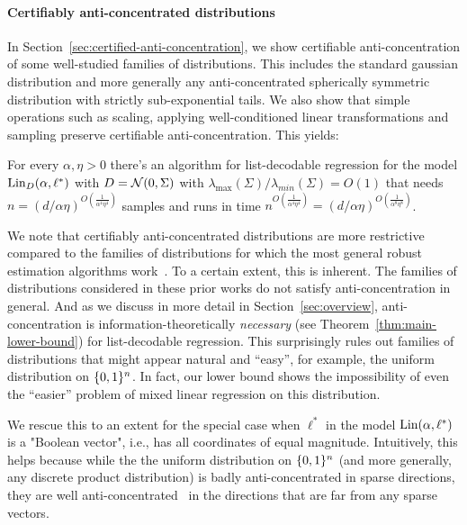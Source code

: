 \paragraph{Certifiably anti-concentrated distributions} In Section~\ref{sec:certified-anti-concentration}, we show certifiable anti-concentration of some well-studied families of distributions. This includes the standard gaussian distribution and more generally any anti-concentrated spherically symmetric distribution with strictly sub-exponential tails. We also show that simple operations such as scaling, applying well-conditioned linear transformations and sampling preserve certifiable anti-concentration. This yields:
\begin{corollary}
For every $\alpha, \eta > 0$ there's an algorithm for list-decodable regression for the model $\mathrm{Lin}_D(\alpha,\ell^*)$ with $D = \mathcal N(0,\Sigma)$ with $\lambda_{\max}(\Sigma)/\lambda_{min}(\Sigma) = O(1)$ that needs $n = (d/\alpha \eta)^{O\left(\frac{1}{\alpha^4 \eta^4}\right)}$  samples and runs in time $n^{O\left(\frac{1}{\alpha^4 \eta^4}\right)} = (d/\alpha \eta)^{O\left(\frac{1}{\alpha^8 \eta^8}\right)}$.
\end{corollary} 

We note that certifiably anti-concentrated distributions are more restrictive compared to the families of distributions for which the most general robust estimation algorithms work~\cite{2017KS,KothariSteinhardt17,DBLP:conf/colt/KlivansKM18}. To a certain extent, this is inherent. The families of distributions considered in these prior works do not satisfy anti-concentration in general.  And as we discuss in more detail in Section~\ref{sec:overview}, anti-concentration is information-theoretically \emph{necessary} (see Theorem~\ref{thm:main-lower-bound}) for list-decodable regression. This surprisingly rules out families of distributions that might appear natural and ``easy'', for example, the uniform distribution on $\{0,1\}^n$. In fact, our lower bound shows the impossibility of even the ``easier'' problem of mixed linear regression on this distribution.

We rescue this to an extent for the special case when $\ell^*$ in the model $\mathrm{Lin}(\alpha,\ell^*)$ is a "Boolean vector", i.e., has all coordinates of equal magnitude. Intuitively, this helps because  while the the uniform distribution on $\{0,1\}^n$ (and more generally, any discrete product distribution) is badly anti-concentrated in sparse directions, they are well anti-concentrated~\cite{ErdosLittlewoodOfford} in the directions that are far from any sparse vectors. 

